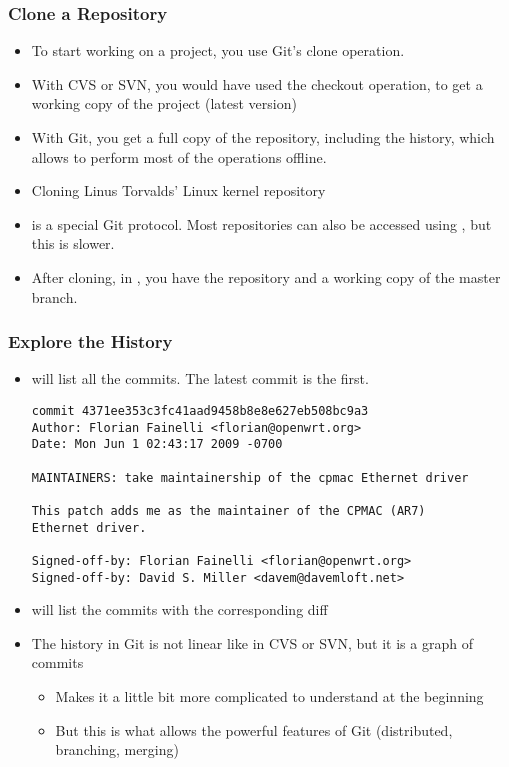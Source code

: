 \begin{frame}
  \frametitle{Clone a Repository}
  \begin{itemize}
  \item To start working on a project, you use Git's clone operation.
  \item With CVS or SVN, you would have used the checkout operation,
    to get a working copy of the project (latest version)
  \item With Git, you get a full copy of the repository, including the
    history, which allows to perform most of the operations offline.
  \item Cloning Linus Torvalds' Linux kernel repository
  \item {} is a special Git protocol. Most repositories can
    also be accessed using , but this is slower.
  \item After cloning, in , you have the repository and a
    working copy of the master branch.
  \end{itemize}
\end{frame}

\begin{frame}[fragile]
  \frametitle{Explore the History}
  \begin{itemize}
  \item {} will list all the commits. The latest commit is
    the first.
{\scriptsize
\begin{verbatim}
commit 4371ee353c3fc41aad9458b8e8e627eb508bc9a3
Author: Florian Fainelli <florian@openwrt.org>
Date: Mon Jun 1 02:43:17 2009 -0700

MAINTAINERS: take maintainership of the cpmac Ethernet driver

This patch adds me as the maintainer of the CPMAC (AR7)
Ethernet driver.

Signed-off-by: Florian Fainelli <florian@openwrt.org>
Signed-off-by: David S. Miller <davem@davemloft.net>
\end{verbatim}
}
  \item {} will list the commits with the corresponding
    diff
  \item The history in Git is not linear like in CVS or SVN, but it is
    a graph of commits
    \begin{itemize}
    \item Makes it a little bit more complicated to understand at the
      beginning
    \item But this is what allows the powerful features of Git
      (distributed, branching, merging)
    \end{itemize}
  \end{itemize}
\end{frame}

